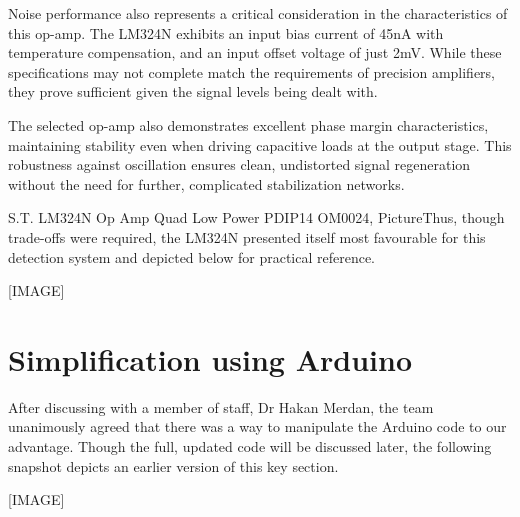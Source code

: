 Noise performance also represents a critical consideration in the characteristics of this op-amp. The LM324N exhibits an input bias current of 45nA with temperature compensation, and an input offset voltage of just 2mV. While these specifications may not complete match the requirements of precision amplifiers, they prove sufficient given the signal levels being dealt with.

The selected op-amp also demonstrates excellent phase margin characteristics, maintaining stability even when driving capacitive loads at the output stage. This robustness against oscillation ensures clean, undistorted signal regeneration without the need for further, complicated stabilization networks.

S.T. LM324N Op Amp Quad Low Power PDIP14 OM0024, PictureThus, though trade-offs were required, the LM324N presented itself most favourable for this detection system and depicted below for practical reference.

    [IMAGE]

\section{Simplification using Arduino}
After discussing with a member of staff, Dr Hakan Merdan, the team unanimously agreed that there was a way to manipulate the Arduino code to our advantage. Though the full, updated code will be discussed later, the following snapshot depicts an earlier version of this key section.

    [IMAGE]